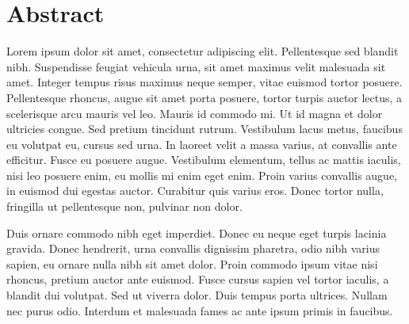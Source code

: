 \chapter*{Abstract}
 Lorem ipsum dolor sit amet, consectetur adipiscing elit. Pellentesque sed blandit nibh. Suspendisse feugiat vehicula urna, sit amet maximus velit malesuada sit amet. Integer tempus risus maximus neque semper, vitae euismod tortor posuere. Pellentesque rhoncus, augue sit amet porta posuere, tortor turpis auctor lectus, a scelerisque arcu mauris vel leo. Mauris id commodo mi. Ut id magna et dolor ultricies congue. Sed pretium tincidunt rutrum. Vestibulum lacus metus, faucibus eu volutpat eu, cursus sed urna. In laoreet velit a massa varius, at convallis ante efficitur. Fusce eu posuere augue. Vestibulum elementum, tellus ac mattis iaculis, nisi leo posuere enim, eu mollis mi enim eget enim. Proin varius convallis augue, in euismod dui egestas auctor. Curabitur quis varius eros. Donec tortor nulla, fringilla ut pellentesque non, pulvinar non dolor.

Duis ornare commodo nibh eget imperdiet. Donec eu neque eget turpis lacinia gravida. Donec hendrerit, urna convallis dignissim pharetra, odio nibh varius sapien, eu ornare nulla nibh sit amet dolor. Proin commodo ipsum vitae nisi rhoncus, pretium auctor ante euismod. Fusce cursus sapien vel tortor iaculis, a blandit dui volutpat. Sed ut viverra dolor. Duis tempus porta ultrices. Nullam nec purus odio. Interdum et malesuada fames ac ante ipsum primis in faucibus.